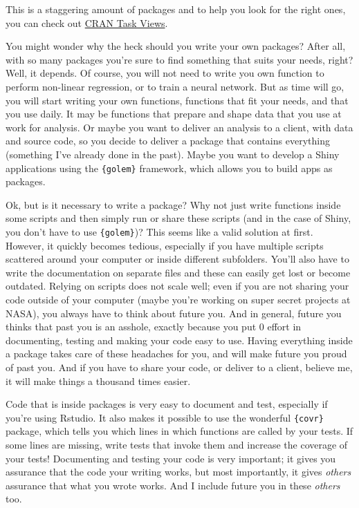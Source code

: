 \documentclass[
]{article}
\begin{document}
This is a staggering amount of packages and to help you look for the right ones, you can check
out \href{https://cran.r-project.org/}{CRAN Task Views}.

You might wonder why the heck should you write your own packages? After all, with so many packages
you're sure to find something that suits your needs, right? Well, it depends. Of course, you will
not need to write you own function to perform non-linear regression, or to train a neural network.
But as time will go, you will start writing your own functions, functions that fit your needs, and
that you use daily. It may be functions that prepare and shape data that you use at work for
analysis. Or maybe you want to deliver an analysis to a client, with data and source code, so
you decide to deliver a package that contains everything (something I've already done in the
past). Maybe you want to develop a Shiny applications using the \texttt{\{golem\}} framework, which allows
you to build apps as packages.

Ok, but is it necessary to write a package? Why not just write functions inside some scripts and
then simply run or share these scripts (and in the case of Shiny, you don't have to use \texttt{\{golem\}})?
This seems like a valid solution at first. However, it quickly becomes tedious, especially if you
have multiple scripts scattered around your computer or inside different subfolders. You'll also
have to write the documentation on separate files and these can easily get lost or become outdated.
Relying on scripts does not scale well; even if you are not sharing your code outside of your
computer (maybe you're working on super secret projects at NASA), you always have to think about
future you. And in general, future you thinks that past you is an asshole, exactly because you put
0 effort in documenting, testing and making your code easy to use. Having everything inside a
package takes care of these headaches for you, and will make future you proud of past you. And if
you have to share your code, or deliver to a client, believe me, it will make things a thousand
times easier.

Code that is inside packages is very easy to document and test, especially if you're using Rstudio.
It also makes it possible to use the wonderful \texttt{\{covr\}} package, which tells you which lines in
which functions are called by your tests. If some lines are missing, write tests that invoke them and
increase the coverage of your tests! Documenting and testing your code is very important; it gives
you assurance that the code your writing works, but most importantly, it gives \emph{others} assurance
that what you wrote works. And I include future you in these \emph{others} too.
\end{document}
